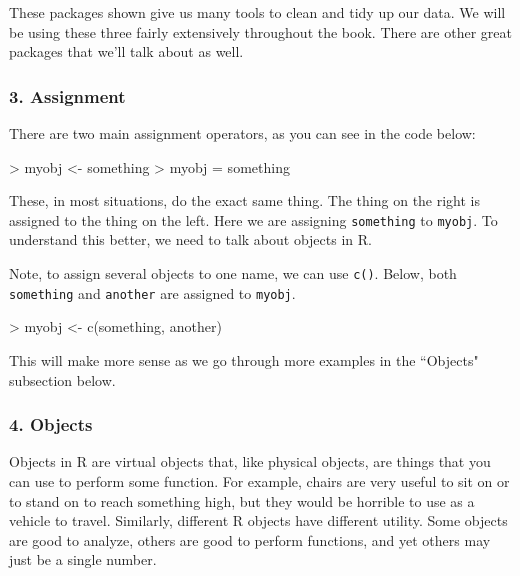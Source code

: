\documentclass{book}
\begin{document}
These packages shown give us many tools to clean and tidy up our data. We will be using these three fairly extensively throughout the book. There are other great packages that we'll talk about as well.

\subsubsection*{3. Assignment}

There are two main assignment operators, as you can see in the code below:

\begin{Schunk}
\begin{Sinput}
> myobj <- something
> myobj = something
\end{Sinput}
\end{Schunk}

These, in most situations, do the exact same thing. The thing on the right is assigned to the thing on the left. Here we are assigning \verb|something| to \verb|myobj|. To understand this better, we need to talk about objects in R.

Note, to assign several objects to one name, we can use \verb|c()|. Below, both \verb|something| and \verb|another| are assigned to \verb|myobj|. 

\begin{Schunk}
\begin{Sinput}
> myobj <- c(something, another)
\end{Sinput}
\end{Schunk}

This will make more sense as we go through more examples in the ``Objects" subsection below.

\subsubsection*{4. Objects}

Objects in R are virtual objects that, like physical objects, are things that you can use to perform some function. For example, chairs are very useful to sit on or to stand on to reach something high, but they would be horrible to use as a vehicle to travel. Similarly, different R objects have different utility. Some objects are good to analyze, others are good to perform functions, and yet others may just be a single number.
\end{document}
